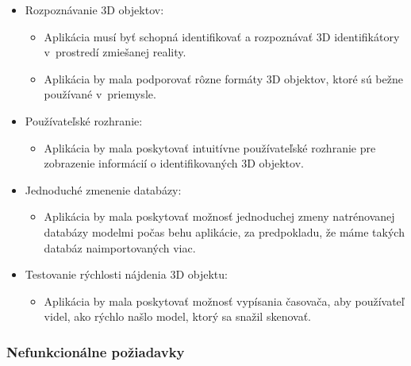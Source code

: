 \begin{itemize}
    \item Rozpoznávanie 3D objektov:
    \begin{itemize}
        \item Aplikácia musí byť schopná identifikovať a rozpoznávať 3D identifikátory v~prostredí zmiešanej reality.
        \item Aplikácia by mala podporovať rôzne formáty 3D objektov, ktoré sú bežne používané v~priemysle.
    \end{itemize}
    \item Používateľské rozhranie:
    \begin{itemize}
        \item Aplikácia by mala poskytovať intuitívne používateľské rozhranie pre zobrazenie informácií o identifikovaných 3D objektov.
    \end{itemize}
    \item Jednoduché zmenenie databázy:
    \begin{itemize}
        \item Aplikácia by mala poskytovať možnosť jednoduchej zmeny natrénovanej databázy modelmi počas behu aplikácie, za predpokladu, že máme takých databáz naimportovaných viac.
    \end{itemize}
    \item Testovanie rýchlosti nájdenia 3D objektu:
    \begin{itemize}
        \item Aplikácia by mala poskytovať možnosť vypísania časovača, aby používateľ videl, ako rýchlo našlo model, ktorý sa snažil skenovať.
    \end{itemize}
\end{itemize}

\subsubsection{Nefunkcionálne požiadavky}


